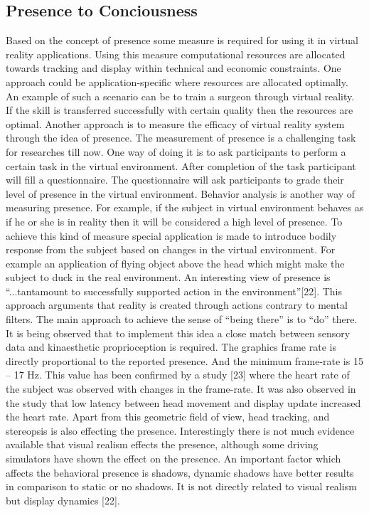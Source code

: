 \subsection{Presence to Conciousness}
  Based on the concept of presence some measure is required for using it in virtual reality applications. Using this measure computational resources are allocated towards tracking and display within technical and economic constraints. One approach could be application-specific where resources are allocated optimally. An example of such a scenario can be to train a surgeon through virtual reality. If the skill is transferred successfully with certain quality then the resources are optimal. Another approach is to measure the efficacy of virtual reality system through the idea of presence. The measurement of presence is a challenging task for researches till now. One way of doing it is to ask participants to perform a certain task in the virtual environment. After completion of the task participant will fill a questionnaire. The questionnaire will ask participants to grade their level of presence in the virtual environment. Behavior analysis is another way of measuring presence. For example, if the subject in virtual environment behaves as if he or she is in reality then it will be considered a high level of presence. To achieve this kind of measure special application is made to introduce bodily response from the subject based on changes in the virtual environment. For example an application of flying object above the head which might make the subject to duck in the real environment. An interesting view of presence is “...tantamount to successfully supported action in the environment”[22]. This approach arguments that reality is created through actions contrary to mental filters. The main approach to achieve the sense of “being there” is to “do” there. It is being observed that to implement this idea a close match between sensory data and kinaesthetic proprioception is required. The graphics frame rate is directly proportional to the reported presence. And the minimum frame-rate is 15 – 17 Hz. This value has been confirmed by a study [23] where the heart rate of the subject was observed with changes in the frame-rate. It was also observed in the study that low latency between head movement and display update increased the heart rate. Apart from this geometric field of view, head tracking, and stereopsis is also effecting the presence. Interestingly there is not much evidence available that visual realism effects the presence, although some driving simulators have shown the effect on the presence. An important factor which affects the behavioral presence is shadows, dynamic shadows have better results in comparison to static or no shadows. It is not directly related to visual realism but display dynamics [22].


